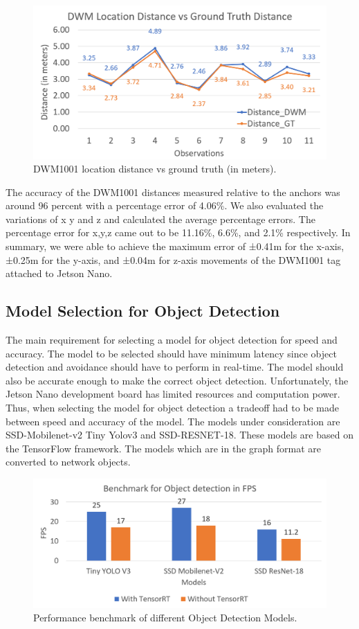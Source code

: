 \documentclass{IEEEtran}
\newcommand{\figwidthb}{0.80\linewidth}
\begin{document}
\begin{figure}[htb]
\centering
\includegraphics[width=1\linewidth]{fig/uwb_distance_graph.png}
\caption{DWM1001 location distance vs ground truth (in meters).} \label{fig.structure}
\end{figure}

The accuracy of the DWM1001 distances measured relative to the anchors was around 96 percent with a percentage error of 4.06{\%}. We also evaluated the variations of x y and z and calculated the average percentage errors. The percentage error for x,y,z came out to be 11.16{\%}, 6.6{\%}, and 2.1{\%} respectively. 
In summary, we were able to achieve the maximum error of ±0.41m for the x-axis, ±0.25m for the y-axis, and ±0.04m for z-axis movements of the DWM1001 tag attached to Jetson Nano.

\subsection{Model Selection for Object Detection}
The main requirement for selecting a model for object detection for speed and accuracy. The model to be selected should have minimum latency since object detection and avoidance should have to perform in real-time. The model should also be accurate enough to make the correct object detection. Unfortunately, the Jetson Nano development board has limited resources and computation power. Thus, when selecting the model for object detection a tradeoff had to be made between speed and accuracy of the model. The models under consideration are SSD-Mobilenet-v2 Tiny Yolov3 and SSD-RESNET-18. These models are based on the TensorFlow framework. The models which are in the graph format are converted to network objects.

\begin{figure}[htb]
\centering
\includegraphics[width=\figwidthb]{fig/benchmark.png}
\caption{Performance benchmark of different Object Detection Models.} \label{fig.structure}
\end{figure}
\end{document}
